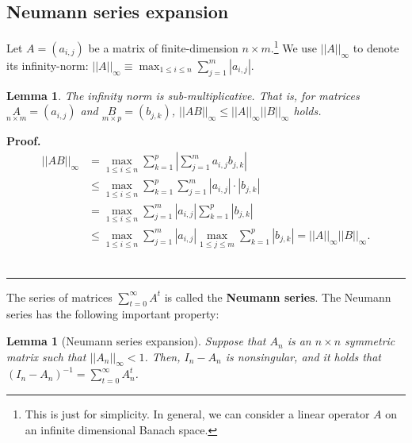 \documentclass[10.5pt, A4paper, openany, uplatex]{book}
\newtheorem{lemma}[theorem]{Lemma}
\newenvironment{proof}[1][Proof]{\textbf{#1.} }{\  \rule{0.5em}{0.5em}}
\numberwithin{equation}{section}
\begin{document}
\begin{appendices}
	\section{Neumann series expansion}\label{sec:neumann}
	Let $A = (a_{i,j})$ be a matrix of finite-dimension $n \times m$.\footnote{
		This is just for simplicity.
		In general, we can consider a linear operator $A$ on an infinite dimensional Banach space.
	}
	We use $||A||_\infty$ to denote its infinity-norm: $||A||_\infty \equiv \max_{1 \le i \le n}\sum_{j = 1}^m |a_{i,j}|$.
	
	\begin{lemma}
		The infinity norm is sub-multiplicative.
		That is, for matrices $\underset{n \times m}{A} = (a_{i,j})$ and $\underset{m \times p}{B} = (b_{j,k})$, $||A B ||_\infty \le ||A||_\infty ||B||_\infty$ holds.
	\end{lemma}
	
	\begin{proof}
		\begin{align*}
		||A B ||_\infty
		& = \max_{1 \le i \le n}\sum_{k = 1}^p \left| \sum_{j = 1}^m a_{i,j} b_{j,k} \right| \\
		& \le \max_{1 \le i \le n}\sum_{k = 1}^p \sum_{j = 1}^m | a_{i,j}| \cdot |b_{j,k}| \\
		& =\max_{1 \le i \le n} \sum_{j = 1}^m | a_{i,j}| \sum_{k = 1}^p |b_{j,k}| \\
		& \le \max_{1 \le i \le n} \sum_{j = 1}^m | a_{i,j}| \max_{1 \le j \le m} \sum_{k = 1}^p |b_{j,k}| = ||A ||_\infty ||B||_\infty.
		\end{align*}
	\end{proof}
	
	The series of matrices $\sum_{t = 0}^\infty A^t$ is called the \textbf{Neumann series}.
	The Neumann series has the following important property:
	\begin{lemma}[Neumann series expansion]\label{lem:neumann}
		Suppose that $A_n$ is an $n \times n$ symmetric matrix such that $||A_n||_\infty < 1$.
		Then, $I_n - A_n$ is nonsingular, and it holds that $(I_n - A_n)^{-1} = \sum_{t = 0}^\infty A_n^t$.
	\end{lemma}
	

\end{appendices}
\end{document}
